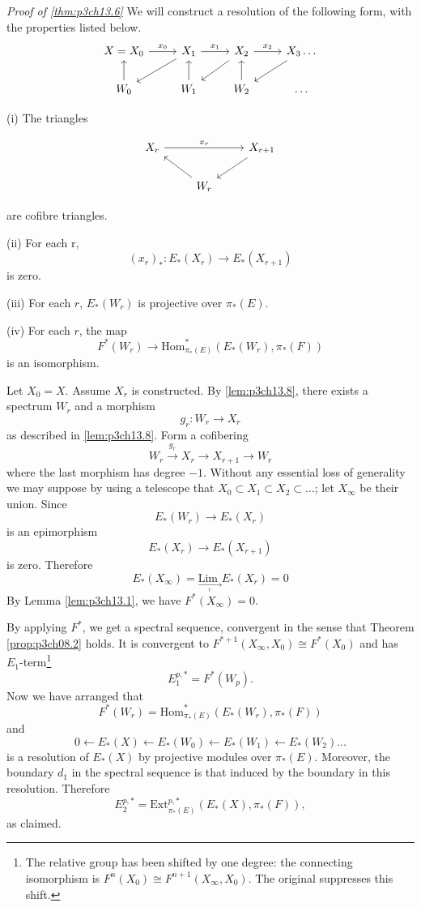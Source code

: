 \documentclass[../main]{subfiles}
\begin{document}
\emph{Proof of \ref{thm:p3ch13.6}} We will construct a resolution of the following form, with the properties listed below.
\[\begin{tikzcd}
	{X=X_0} & {X_1} & {X_2} & {X_3 \dots} \\
	{W_0} & {W_1} & {W_2} & \dots
	\arrow["{x_1}", from=1-2, to=1-3]
	\arrow["{x_2}", from=1-3, to=1-4]
	\arrow[from=1-4, to=2-3]
	\arrow[from=2-3, to=1-3]
	\arrow[from=1-3, to=2-2]
	\arrow[from=2-2, to=1-2]
	\arrow["{x_0}", from=1-1, to=1-2]
	\arrow[from=1-2, to=2-1]
	\arrow[from=2-1, to=1-1]
\end{tikzcd}\]

(i) The triangles

\[\begin{tikzcd}
	{X_r} & {} & {X_{r+1}} \\
	& {W_r} & {}
	\arrow["{x_r}", from=1-1, to=1-3]
	\arrow[from=1-3, to=2-2]
	\arrow[from=2-2, to=1-1]
\end{tikzcd}\]

are cofibre triangles.

(ii) For each r,
\[(x_r)_\ast \colon E_\ast(X_r) \longrightarrow E_\ast(X_{r+1})\]
is zero.

(iii) For each $r$, $E_\ast(W_r)$ is projective over $\pi_\ast(E)$.

(iv) For each $r$, the map
\[F^\ast(W_r) \longrightarrow \text{Hom}^\ast_{\pi_\ast(E)}(E_\ast(W_r), \pi_\ast(F))\]
is an isomorphism.

Let $X_0 = X$. Assume $X_r$ is constructed. By \ref{lem:p3ch13.8}, there exists a spectrum $W_r$ and a morphism
\[g_r \colon W_r \longrightarrow X_r\]
as described in \ref{lem:p3ch13.8}. Form a cofibering
\[W_r\overset{g_r}{\longrightarrow} X_r \longrightarrow X_{r+1} \longrightarrow W_r\]
where the last morphism has degree $-1$. Without any essential loss of generality we may suppose by using a telescope that $X_0 \subset X_1 \subset X_2 \subset \dots$; let $X_\infty$ be their union. Since
\[E_\ast(W_r) \longrightarrow E_\ast(X_r)\]
is an epimorphism
\[E_\ast(X_r) \longrightarrow E_\ast(X_{r+1})\]
is zero. Therefore
\[E_\ast(X_\infty) = \underset{\underset{r}{\longrightarrow}}{\text{Lim }} E_\ast(X_r) = 0\]
By Lemma \ref{lem:p3ch13.1}, we have $F^\ast(X_\infty) = 0$.

By applying $F^\ast$, we get a spectral sequence, convergent in the sense that Theorem \ref{prop:p3ch08.2} holds. It is convergent to $F^{\ast+1}(X_\infty, X_0) \cong F^\ast(X_0)$ and has $E_1$-term\footnote{The relative group has been shifted by one degree: the connecting isomorphism is $F^n(X_0)\cong F^{n+1}(X_\infty,X_0)$. The original suppresses this shift.}
\[E^{p, \ast}_1 = F^\ast(W_p).\]
Now we have arranged that
\[F^\ast(W_r) = \text{Hom}^\ast_{\pi_\ast(E)}(E_\ast(W_r), \pi_\ast(F))\]
and
\[0 \longleftarrow E_\ast(X) \longleftarrow E_\ast(W_0) \longleftarrow E_\ast(W_1) \longleftarrow E_\ast(W_2) \dots\]
is a resolution of $E_\ast(X)$ by projective modules over $\pi_\ast(E)$. Moreover, the boundary $d_1$ in the spectral sequence is that induced by the boundary in this resolution. Therefore
\[E_2^{p, \ast} = \text{Ext}^{p, \ast}_{\pi_\ast(E)}(E_\ast(X), \pi_\ast(F)),\]
as claimed.
\end{document}
